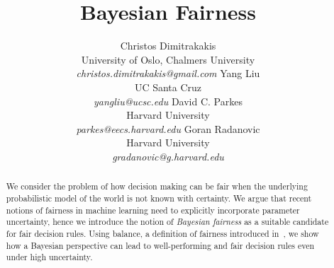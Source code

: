 \documentclass[letterpaper]{article}
\title{Bayesian Fairness}
\author{Christos Dimitrakakis\\University of Oslo, Chalmers University\\ \textit{christos.dimitrakakis@gmail.com}
  \And
  Yang Liu\\UC Santa Cruz\\\textit{yangliu@ucsc.edu}
\And
David C. Parkes\\Harvard University\\\textit{parkes@eecs.harvard.edu}
\And
Goran Radanovic\\Harvard University\\\textit{gradanovic@g.harvard.edu}
}
\begin{document}

\maketitle

\begin{abstract}
  We consider the problem of how decision making can be fair when the
  underlying probabilistic model of the world is not known with
  certainty. We argue that recent notions of fairness in machine
  learning need to explicitly incorporate parameter uncertainty, hence
  we introduce the notion of {\em Bayesian fairness} as a suitable
  candidate for fair decision rules. Using balance, a definition of
  fairness introduced in~\citep{kleinberg2016inherent}, we show how a
  Bayesian perspective can lead to well-performing and fair decision
  rules even under high uncertainty.
  \end{abstract}

















\newpage
\onecolumn
\appendix

%
%
%
\end{document}
